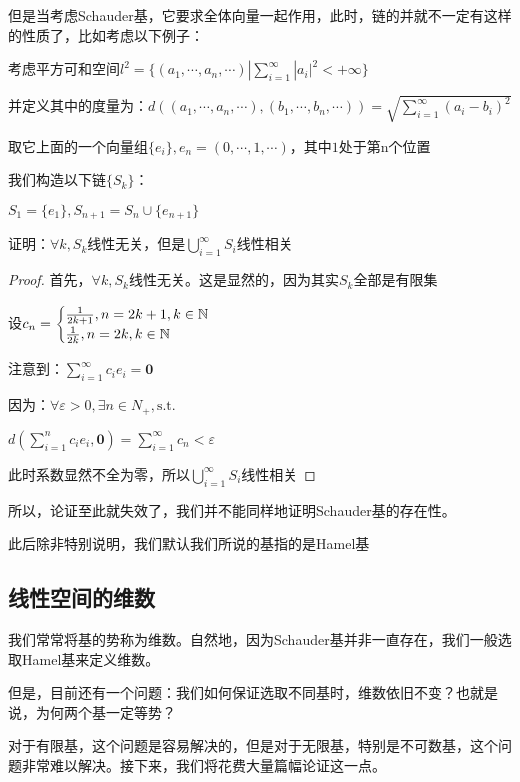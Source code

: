 \documentclass[12pt, a4paper, oneside, UTF8]{ctexbook}
\begin{document}
			但是当考虑Schauder基，它要求全体向量一起作用，此时，链的并就不一定有这样的性质了，比如考虑以下例子：
			\begin{example}
				考虑平方可和空间$l^2 = \{(a_1,\cdots,a_n,\cdots)| \sum\limits_{i=1}^{\infty} |a_i|^2 < + \infty\}$

				并定义其中的度量为：$d\left((a_1,\cdots,a_n,\cdots),(b_1,\cdots,b_n,\cdots)\right)=\sqrt{\sum\limits_{i=1}^{\infty} (a_i-b_i)^2}$
				
				取它上面的一个向量组$\{e_i\},e_n = (0,\cdots,1,\cdots)$，其中$1$处于第n个位置

				我们构造以下链$\{S_k\}$：

				$S_1 = \{e_1\},S_{n+1}=S_n \cup \{e_{n+1}\}$

				证明：$\forall k,S_k$线性无关，但是$\bigcup_{i=1}^{\infty} S_i$线性相关
			\end{example}
			\begin{proof}
				首先，$\forall k,S_k$线性无关。这是显然的，因为其实$S_k$全部是有限集

				设$c_n = \begin{cases}
					\frac{1}{2k+1},n=2k+1,k \in \mathbb{N} \\
					\frac{1}{2k},n=2k,k\in \mathbb{N} \\
				\end{cases}$

				注意到：$\sum\limits_{i=1}^{\infty} c_i e_i = \mathbf{0}$

				因为：$\forall \varepsilon >0,\exists n \in N_+,\text{s.t.}$
				
				$d\left(\sum\limits_{i=1}^{n} c_i e_i,\mathbf{0}\right)=\sum\limits_{i=1}^{\infty} c_n < \varepsilon $

				此时系数显然不全为零，所以$\bigcup_{i=1}^{\infty} S_i$线性相关
			\end{proof}
			所以，论证至此就失效了，我们并不能同样地证明Schauder基的存在性。

			此后除非特别说明，我们默认我们所说的基指的是Hamel基
		\subsection{线性空间的维数}
			我们常常将基的势称为维数。自然地，因为Schauder基并非一直存在，我们一般选取Hamel基来定义维数。

			但是，目前还有一个问题：我们如何保证选取不同基时，维数依旧不变？也就是说，为何两个基一定等势？

			对于有限基，这个问题是容易解决的，但是对于无限基，特别是不可数基，这个问题非常难以解决。接下来，我们将花费大量篇幅论证这一点。
\end{document}
